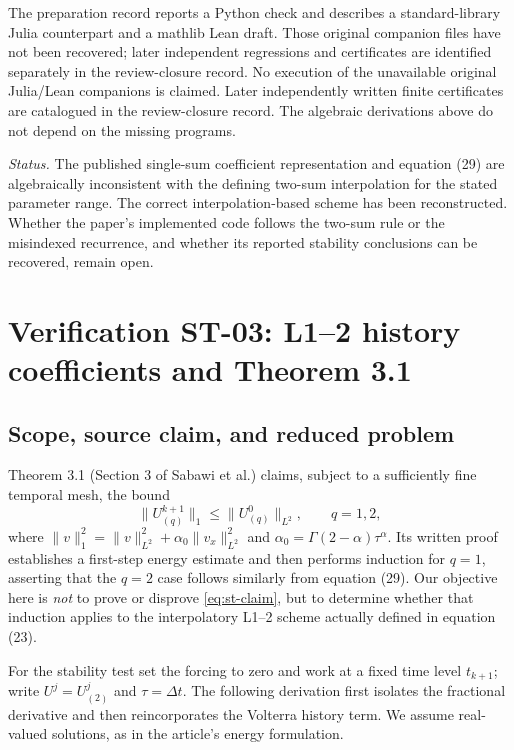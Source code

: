 \documentclass[11pt,a4paper]{amsart}
\theoremstyle{remark}
\theoremstyle{plain}
\theoremstyle{remark}
\numberwithin{equation}{section}
\begin{document}
The preparation record reports a Python check and describes a standard-library Julia counterpart and a mathlib Lean draft. Those original companion files have not been recovered; later independent regressions and certificates are identified separately in the review-closure record. No execution of the unavailable original Julia/Lean companions is claimed. Later independently written finite certificates are catalogued in the review-closure record. The algebraic derivations above do not depend on the missing programs.

\noindent\textit{Status.} The published single-sum coefficient representation and equation (29) are algebraically inconsistent with the defining two-sum interpolation for the stated parameter range. The correct interpolation-based scheme has been reconstructed. Whether the paper's implemented code follows the two-sum rule or the misindexed recurrence, and whether its reported stability conclusions can be recovered, remain open.


\section{Verification ST-03: L1--2 history coefficients and Theorem 3.1}
\label{sec:stability-audit}

\subsection{Scope, source claim, and reduced problem}
Theorem 3.1 (Section 3 of Sabawi et al.) claims, subject to a sufficiently fine temporal mesh, the bound
\begin{equation}\label{eq:st-claim}
 \|U_{(q)}^{k+1}\|_1\leq\|U_{(q)}^0\|_{L^2},\qquad q=1,2,
\end{equation}
where $\|v\|_1^2=\|v\|_{L^2}^2+\alpha_0\|v_x\|_{L^2}^2$ and $\alpha_0=\Gamma(2-\alpha)\tau^\alpha$. Its written proof establishes a first-step energy estimate and then performs induction for $q=1$, asserting that the $q=2$ case follows similarly from equation (29). Our objective here is \emph{not} to prove or disprove \eqref{eq:st-claim}, but to determine whether that induction applies to the interpolatory L1--2 scheme actually defined in equation (23).

For the stability test set the forcing to zero and work at a fixed time level $t_{k+1}$; write $U^j=U_{(2)}^j$ and $\tau=\Delta t$. The following derivation first isolates the fractional derivative and then reincorporates the Volterra history term. We assume real-valued solutions, as in the article's energy formulation.
\end{document}
